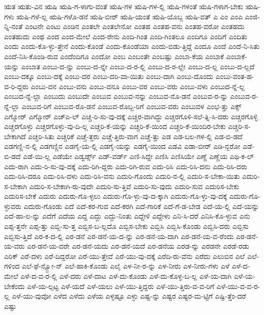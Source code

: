 {ಋತ
ಋತು-ವಿನ
ಋಷಿ
ಋಷಿ-ಗ-ಳಾಗು-ವಂತೆ
ಋಷಿ-ಗಳ
ಋಷಿ-ಗಳ-ಲ್ಲಿ
ಋಷಿ-ಗಳಂತೆ
ಋಷಿ-ಗಳಾಗ-ಬೇಕು
ಋಷಿ-ಗಳು
ಋಷಿ-ಗಳೆ-ಲ್ಲ
ಋಷಿ-ಗಳೊ-ಡನೆ
ಋಷಿ-ಬೀರ್
ಋಷಿ-ಯಂತೆ
ಋಷಿ-ಯೊಬ್ಬ
ಋಷಿ-ವತ್
ಎ
ಎಂ
ಎಂಎ
ಎಂಜಿ-ನ್ನಿ-ನಂತೆ
ಎಂಟನೇ
ಎಂಟು
ಎಂಡಿನ
ಎಂತಲೇ
ಎಂತಲೇನೋ
ಎಂತಹ
ಎಂತಹ-ವನು
ಎಂತಹ-ವರೋ
ಎಂತಹದು
ಎಂತಹುದು
ಎಂಥ
ಎಂದ
ಎಂದ-ಮೇಲೆ
ಎಂದ-ರೇನು
ಎಂದಿ-ಗಿಂತ
ಎಂದಿ-ಗಿಂತಲೂ
ಎಂದಿಗೂ
ಎಂದಿಗೆ
ಎಂದಿತು
ಎಂದು
ಎಂದು-ಕೊ-ಳ್ಳು-ತ್ತೇನೆ
ಎಂದು-ಕೊಂಡೆ
ಎಂದು-ಕೊಂಡೆಯಾ
ಎಂದು-ಬಿಡು-ತ್ತಿದ್ದೆ
ಎಂದೂ
ಎಂದೆ
ಎಂದೆ-ನಿ-ಸಿತು
ಎಂದೆ-ನಿಸಿ-ಕೊಂಡಿ-ರುವ
ಎಂದೆಂದಿಗೂ
ಎಂದೋ
ಎಂಬ
ಎಂಬಂತೇ
ಎಂಬಷ್ಟು
ಎಂಬಾ-ಕೆಯ
ಎಂಬಾಕೆ
ಎಂಬಾಕೆ-ಯನ್ನು
ಎಂಬಾತ
ಎಂಬು-ದ-ನ್ನು
ಎಂಬು-ದ-ನ್ನೇ
ಎಂಬು-ದ-ರ-ಲ್ಲಿ
ಎಂಬು-ದ-ರ-ಲ್ಲೇ
ಎಂಬು-ದ-ಲ್ಲ
ಎಂಬು-ದ-ಲ್ಲದೆ
ಎಂಬು-ದಕ್ಕೂ
ಎಂಬು-ದಕ್ಕೆ
ಎಂಬು-ದರ
ಎಂಬು-ದರಿ-ವಾ-ಯಿತು
ಎಂಬು-ದಾಗಿ
ಎಂಬು-ದೊಂದು
ಎಂಬು-ವಂತ-ಹ-ವ-ರಿ-ದ್ದರು
ಎಂಬು-ವನ
ಎಂಬು-ವನು
ಎಂಬು-ವನೂ
ಎಂಬು-ವರ
ಎಂಬು-ವರು
ಎಂಬು-ವಳು
ಎಂಬುದ-ನ್ನೆ-ಲ್ಲ
ಎಂಬುದ-ನ್ನೆ-ಲ್ಲಾ
ಎಂಬುದು
ಎಂಬುದೇ
ಎಂಬುವ
ಎಂಬುವ-ನನ್ನು
ಎಂಬುವ-ನೊ-ಡನೆ
ಎಂಬುವ-ರ-ನ್ನು
ಎಂಬುವ-ರ-ನ್ನೆ-ಲ್ಲಾ
ಎಂಬುವ-ರಿಗೆ
ಎಂಬುವ-ರೊ-ಡನೆ
ಎಂಬುವ-ರೊಬ್ಬ-ರಿಗೆ
ಎಂಬುವ-ವರು
ಎಂಬುವಳ
ಎಂಭ-ತ್ತು
ಎಕ್ಸ್
ಎಗ್ಮೋರ್
ಎಗ್ಮೋರ್
ಎಚ್ಎ-ಲ್
ಎಚ್ಚ-ರಿ-ಸು-ವು-ದಕ್ಕೆ
ಎಚ್ಚರ-ವಾಗಿದ್ದು
ಎಚ್ಚರಗೊಳಿ-ಸಲೆ-ತ್ನಿ-ಸಿ-ದರು
ಎಚ್ಚರಗೊಳ್ಳಿ
ಎಚ್ಚರಗೊಳ್ಳು
ಎಚ್ಚರಗೊಳ್ಳು-ವು-ದಿ-ಲ್ಲ
ಎಚ್ಚರಿ-ಕೆ-ಯನ್ನು
ಎಚ್ಚರಿ-ಕೆ-ಯಿಂದ
ಎಚ್ಚರಿ-ಕೆ-ಯಿಂದಿರ-ಬೇಕು
ಎಚ್ಚರಿ-ಸ-ಬೇಕಾಗಿದೆ
ಎಚ್ಚರಿ-ಸಿತು
ಎಚ್ಚರಿಕೆ
ಎಚ್ಚೆ-ತ್ತರು
ಎಚ್ಚೆ-ತ್ತಿರು-ವಾಗ
ಎಚ್ಚೆ-ತ್ತು
ಎಡ
ಎಡ-ಬಲ-ಗಳ-ಲ್ಲಿ
ಎಡ-ಬಿ-ಡದೆ
ಎಡಗಣ್ಣಿ-ನ-ಲ್ಲಿ
ಎಡಗಣ್ಣಿನ
ಎಡಗೈ-ಯ-ಲ್ಲಿ
ಎಡಗೈ-ಯನ್ನು
ಎಡಗೈ-ಯಿಂದ
ಎಡವಿ
ಎಡಾ-ಬೀರ್
ಎಡಿ-ನ್ಬರೋ
ಎಡೆ-ಬಿ-ಡದೆ
ಎಡೆ-ಯಿ-ಲ್ಲ
ಎಡೆಯೇ
ಎಡ್ವರ್ಡ್ಸ್
ಎಡ್-ವರ್ಡ್
ಎಣಿ-ಸಿದ್ದೇ
ಎಣಿಸಿ
ಎಣಿಸಿಯೇ
ಎಣ್ಣೆ
ಎಣ್ಣೆಯ
ಎಥಿ-ಕ-ಲ್
ಎದು-ರಾಗಿ
ಎದು-ರಿ-ಸು-ವು-ದಕ್ಕೆ
ಎದು-ರಿಗಿ-ದ್ದರು
ಎದು-ರಿಗಿ-ರುವ
ಎದು-ರಿಸಿ
ಎದು-ರಿಸಿ-ದನು
ಎದು-ರಿಸಿ-ದರು
ಎದು-ರಿಸಿ-ದರೂ
ಎದು-ರಿಸಿ-ದಳು
ಎದು-ರಿಸಿ-ವನು
ಎದುರಿ-ಗೊಂದು
ಎದುರಿ-ನ-ಲ್ಲಿ
ಎದುರಿ-ಸ-ಬೇಕಾ-ಯಿತು
ಎದುರಿ-ಸ-ಬೇಕಾಗಿ
ಎದುರಿ-ಸ-ಬೇಕಾಗಿ-ರು-ವುದೇ
ಎದುರಿ-ಸು-ತ್ತಿವೆ
ಎದುರಿ-ಸು-ವುದು
ಎದುರಿ-ಸುವ
ಎದುರಿಸ-ಬೇಕು
ಎದುರಿಸ-ಬೇಕೆ
ಎದುರು
ಎದುರು-ಗೊ-ಳ್ಳಲು
ಎದುರು-ಗೊ-ಳ್ಳು-ವು-ದ-ಕ್ಕಾಗಿ
ಎದುರು-ಗೊ-ಳ್ಳು-ವು-ದಕ್ಕೆ
ಎದುರು-ಗೊ-ಳ್ಳುವರು
ಎದುರು-ಗೊಂಡು
ಎದೆ
ಎದೆ-ಕರ-ಗುವ
ಎದೆ-ಕರಗಿ
ಎದೆ-ಗಾರಿಕೆ
ಎದೆ-ಗೆ-ಡ-ಬೇಡ
ಎದೆ-ಯ-ಲ್ಲಿ
ಎದೆ-ಯನ್ನು
ಎದೆ-ಹಾ-ಲ-ನ್ನು
ಎದೆಗೆ
ಎದೆಯ
ಎದ್ದ
ಎದ್ದು
ಎದ್ದು-ನಿಂತು
ಎದ್ದೇಳಿ
ಎದ್ದೇಳು
ಎನಿ-ಸಿ-ದರೆ
ಎನಿಸಿ-ಕೊ-ಳ್ಳುವ
ಎನು
ಎಪ್ಪ-ತ್ತನೇ
ಎಪ್ಪ-ತ್ತು
ಎಬ್ಬಿ-ಸು-ತ್ತ
ಎಬ್ಬಿಸ-ಬ-ಲ್ಲದೊ
ಎಬ್ಬಿಸ-ಬೇಕು
ಎಬ್ಬಿಸಿ
ಎಬ್ಬಿಸಿ-ಕೊಂಡು
ಎಬ್ಬಿಸಿ-ದರು
ಎಬ್ಬಿಸು
ಎಬ್ಬಿಸು-ತ್ತಿದೆ
ಎರ-ಕ-ದ-ಲ್ಲಿ
ಎರ-ಡನೆ
ಎರ-ಡನೆ-ಯ-ದ-ನ್ನು
ಎರ-ಡನೆ-ಯ-ದಾಗಿ
ಎರ-ಡನೆ-ಯ-ವ-ರೆಂದು
ಎರ-ಡನೆ-ಯ-ವರು
ಎರ-ಡನೆ-ಯ-ವರೇ
ಎರ-ಡನೆ-ಯದು
ಎರ-ಡನೆ-ಯದೆ
ಎರ-ಡನೆಯ
ಎರಡ-ನ್ನು
ಎರಡನೇ
ಎರಡೆ-ರಡು
ಎರಿಕ್
ಎರೆ-ದಳು
ಎರೆ-ದಿದ್ದರೋ
ಎರೆ-ಯು-ತ್ತೇವೆ
ಎರೆ-ಯು-ವು-ದಕ್ಕೆ
ಎರೆದಿ-ರು-ವೆನು
ಎರೆದು
ಎಲುಬಿನ
ಎಲೆ
ಎಲೆ-ಗಳಿಂದ
ಎಲೆ-ಫೆ-ನ್ಸ್ಟೋ-ನ್
ಎಲೆ-ಹಾಕಿ-ಕೊಂಡು
ಎಲೈ
ಎಳ-ನೀ-ರ-ನ್ನು
ಎಳ-ನೀರು
ಎಳ-ನೀರು-ಗಳು
ಎಳೆ
ಎಳೆ-ದ-ಮೇಲೆ
ಎಳೆ-ದ-ವ-ರ-ಲ್ಲಿ
ಎಳೆ-ದರು
ಎಳೆ-ದಾಟ
ಎಳೆ-ದು-ಕೊಂಡು
ಎಳೆ-ದು-ಕೊಳ್ಳ-ಬ-ಲ್ಲ
ಎಳೆ-ಯ-ದಾಗಿ
ಎಳೆ-ಯ-ಬೇಕೆಂದು
ಎಳೆ-ಯ-ಲ್ಪಟ್ಟ
ಎಳೆ-ಯದೆ
ಎಳೆ-ಯಲು
ಎಳೆ-ಯು-ತ್ತಿದ್ದರು
ಎಳೆ-ಯು-ತ್ತಿರು-ವ-ವ-ರಿಗೆ
ಎಳೆ-ಯು-ವ-ವ-ರ-ಲ್ಲ
ಎಳೆ-ಯು-ವುವೋ
ಎಳೆದ
ಎಳೆದು
ಎಳೆಯ
ಎಳ್ಳಷ್ಟೂ
ಎಳ್ಳು
ಎಷ್ಟ-ನ್ನು
ಎಷ್ಟರ
ಎಷ್ಟರ-ಮ-ಟ್ಟಿಗೆ
ಎಷ್ಟಿ-ತ್ತೆಂ-ದರೆ
ಎಷ್ಟು
}
